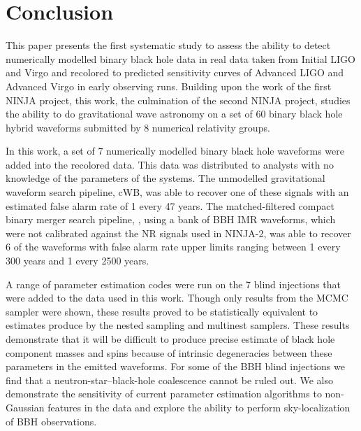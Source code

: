 % 

\section{Conclusion}
\label{sec:conclusions}

This paper presents the first systematic study to assess the ability to 
detect numerically modelled binary black hole data in real data taken from 
Initial LIGO and Virgo and recolored to predicted sensitivity curves of 
Advanced LIGO and Advanced Virgo in early observing runs. Building upon the 
work of the first NINJA project, this work, the culmination of the second NINJA 
project, studies the ability to do gravitational wave astronomy on a set of 60 
binary black hole hybrid waveforms submitted by 8 numerical relativity groups. 

In this work, a set of 7 numerically modelled binary black hole waveforms were 
added into the recolored data. This data was distributed to analysts with no 
knowledge of the parameters of the systems. The unmodelled gravitational 
waveform search pipeline, cWB, was able to recover one of these signals with an 
estimated false alarm rate of 1 every 47 years. The matched-filtered compact 
binary merger search pipeline, \ihope{}, using a bank of BBH IMR waveforms, 
which were not calibrated against the NR signals used in NINJA-2, was able 
to recover 6 of the waveforms with false alarm rate upper limits ranging 
between 
1 every 300 years and 1 every 2500 years. 

A range of parameter estimation codes were run on the 7 blind injections 
that were added to the data used in this work. Though only results from
the MCMC sampler were shown, these results proved to be statistically
equivalent to estimates produce by the nested sampling and multinest
samplers. These results demonstrate that it will be difficult to produce 
precise estimate of black hole component masses and spins because of intrinsic 
degeneracies between these parameters in the emitted waveforms. For some of the 
BBH blind injections we find that a neutron-star--black-hole coalescence cannot 
be ruled out. We also demonstrate the sensitivity of current parameter 
estimation algorithms to non-Gaussian features in the data and explore the 
ability to perform sky-localization of BBH observations.

